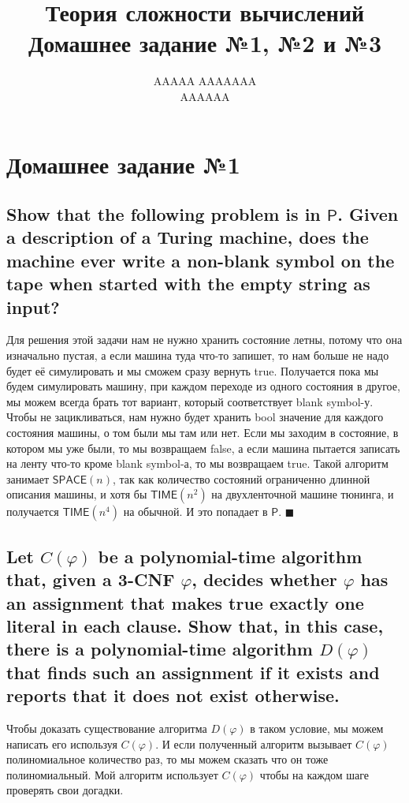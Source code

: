 \documentclass{article}
\title{Теория сложности вычислений \\ Домашнее задание №1, №2 и №3}
\author{AAAAA AAAAAAA \\ AAAAAA}
\let\temp\phi
\let\phi\varphi
\let\varphi\temp
\begin{document}
  \maketitle

  \section{Домашнее задание №1}
  \setcounter{subsection}{9}
  \subsection{Show that the following problem is in $\mathsf{P}$. Given a description of a Turing machine, does the machine ever write a non-blank symbol on the tape when started with the empty string as input?}
  Для решения этой задачи нам не нужно хранить состояние летны, потому что она изначально пустая,
  а если машина туда что-то запишет, то нам больше не надо будет её симулировать и мы сможем сразу вернуть true.
  Получается пока мы будем симулировать машину, при каждом переходе из одного состояния в другое,
  мы можем всегда брать тот вариант, который соответствует blank symbol-у.
  Чтобы не зацикливаться, нам нужно будет хранить bool значение для каждого состояния машины, о том были мы там или нет.
  Если мы заходим в состояние, в котором мы уже были, то мы возвращаем false,
  а если машина пытается записать на ленту что-то кроме blank symbol-а, то мы возвращаем true.
  Такой алгоритм занимает $\mathsf{SPACE}(n)$, так как количество состояний ограниченно длинной описания машины,
  и хотя бы $\mathsf{TIME}(n^2)$ на двухленточной машине тюнинга, и получается $\mathsf{TIME}(n^4)$ на обычной.
  И это попадает в $\mathsf{P}$.
  $\blacksquare$

  \subsection{Let $C(\phi)$ be a polynomial-time algorithm that, given a 3-CNF $\phi$, decides whether $\phi$ has an assignment that makes true exactly one literal in each clause. Show that, in this case, there is a polynomial-time algorithm $D(\phi)$ that finds such an assignment if it exists and reports that it does not exist otherwise.}
  Чтобы доказать существование алгоритма $D(\phi)$ в таком условие, мы можем написать его используя $C(\phi)$.
  И если полученный алгоритм вызывает $C(\phi)$ полиномиальное количество раз, то мы можем сказать что он тоже полиномиальный.
  Мой алгоритм использует $C(\phi)$ чтобы на каждом шаге проверять свои догадки.
\end{document}
